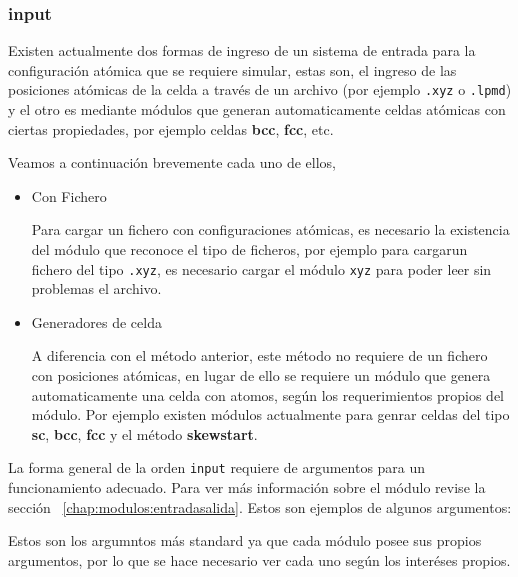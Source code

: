 \subsubsection{input}

Existen actualmente dos formas de ingreso de un sistema de entrada para la configuraci\'on at\'omica que se requiere simular, estas son, el ingreso de las posiciones at\'omicas de la celda a trav\'es de un archivo (por ejemplo \verb|.xyz| o \verb|.lpmd|) y el otro es mediante m\'odulos que generan automaticamente celdas at\'omicas con ciertas propiedades, por ejemplo celdas \textbf{bcc}, \textbf{fcc}, etc.

Veamos a continuaci\'on brevemente cada uno de ellos,

\begin{itemize}
 \item{Con Fichero}

Para cargar un fichero con configuraciones at\'omicas, es necesario la existencia del m\'odulo que reconoce el tipo de ficheros, por ejemplo para cargarun fichero del tipo \verb|.xyz|, es necesario cargar el m\'odulo \verb|xyz| para poder leer sin problemas el archivo. 
  \item{Generadores de celda}

A diferencia con el m\'etodo anterior, este m\'etodo no requiere de un fichero con posiciones at\'omicas, en lugar de ello se requiere un m\'odulo que genera automaticamente una celda con atomos, seg\'un los requerimientos propios del m\'odulo. Por ejemplo existen m\'odulos actualmente para genrar celdas del tipo \textbf{sc}, \textbf{bcc}, \textbf{fcc} y el m\'etodo \textbf{skewstart}.

\end{itemize}

La forma general de la orden \verb|input| requiere de argumentos para un funcionamiento adecuado. Para ver m\'as informaci\'on sobre el m\'odulo revise la secci\'on ~\ref{chap:modulos:entradasalida}. Estos son ejemplos de algunos argumentos:


Estos son los argumntos m\'as standard ya que cada m\'odulo posee sus propios argumentos, por lo que se hace necesario ver cada uno seg\'un los inter\'eses propios.

